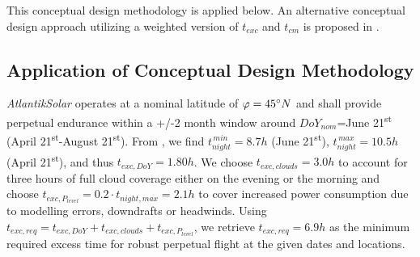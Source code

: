 This conceptual design methodology is applied below. An alternative conceptual design approach utilizing a weighted version of $t_{exc}$ and $t_{cm}$ is proposed in \cite{Morton_ICRA2013}. 

\subsection{Application of Conceptual Design Methodology} \label{sec:ConceptDesignApplication}

\textit{AtlantikSolar} operates at a nominal latitude of $\varphi=45\degree N$ and shall provide perpetual endurance within a +/-2 month window around $DoY_{nom}$=June 21\textsuperscript{st} (April 21\textsuperscript{st}-August 21\textsuperscript{st}). From \cite{Duffie_SolarEngineering}, we find $t_{night}^{\,min}=8.7h$ (June 21\textsuperscript{st}), $t_{night}^{\,max}=10.5h$(April 21\textsuperscript{st}), and thus $t_{exc,DoY}=1.80h$. We choose $t_{exc,clouds}=3.0h$ to account for three hours of full cloud coverage either on the evening or the morning and choose $t_{exc,P_{level}}=0.2\cdot t_{night,max}=2.1h$ to cover increased power consumption due to modelling errors, downdrafts or headwinds. Using $t_{exc,req}=t_{exc,DoY}+t_{exc,clouds}+t_{exc,P_{level}}$, we retrieve $t_{exc,req}=6.9h$ as the minimum required excess time for robust perpetual flight at the given dates and locations. 

